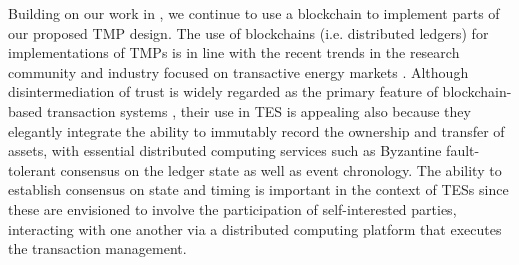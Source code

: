 Building on our work in \cite{Laszka17}, 
we continue to use a blockchain to implement parts of our proposed TMP design. The use of blockchains (i.e. distributed ledgers) for implementations of TMPs is in line with the recent trends in the research community and industry focused on transactive energy markets \cite{Lo3Patent,PowerLedger}.
Although disintermediation of trust is widely regarded as the primary feature of blockchain-based transaction systems \cite{SpectrumBC}, their use in TES is appealing also because they elegantly integrate the ability to immutably record the ownership and transfer of assets, with essential distributed computing services such as Byzantine fault-tolerant consensus on the ledger state as well as event chronology. The ability to establish consensus on state and timing is important in the context of TESs since these are envisioned to involve the participation of self-interested parties, interacting with one another via a distributed computing platform that executes the transaction management. %









